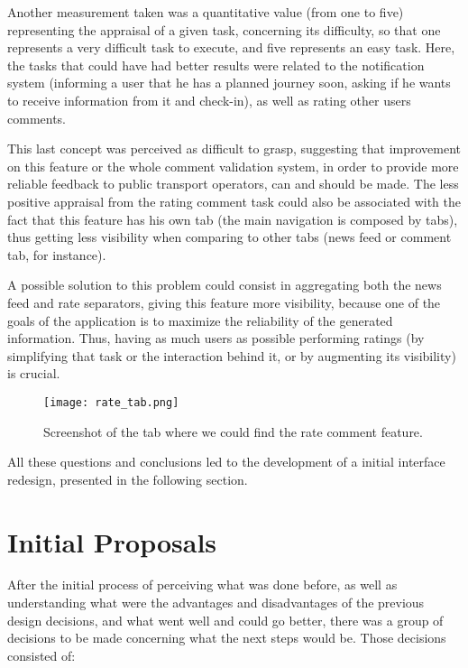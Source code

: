 Another measurement taken was a quantitative value (from one to five) representing the appraisal of a given task, concerning its difficulty, so that one represents a very difficult task to execute, and five represents an easy task.
Here, the tasks that could have had better results were related to the notification system (informing a user that he has a planned journey soon, asking if he wants to receive information from it and check-in), as well as rating other users comments. 

This last concept was perceived as difficult to grasp, suggesting that improvement on this feature or the whole comment validation system, in order to provide more reliable feedback to public transport operators, can and should be made.
The less positive appraisal from the rating comment task could also be associated with the fact that this feature has his own tab (the main navigation is composed by tabs), thus getting less visibility when comparing to other tabs (news feed or comment tab, for instance). 

A possible solution to this problem could consist in aggregating both the news feed and rate separators, giving this feature more visibility, because one of the goals of the application is to maximize the reliability of the generated information. Thus, having as much users as possible performing ratings (by simplifying that task or the interaction behind it, or by augmenting its visibility) is crucial.

\begin{figure}[h!]
  \begin{center}
    \leavevmode
    \texttt{[image: rate\_tab.png]}
    \caption{Screenshot of the tab where we could find the rate comment feature.}
    \label{fig:iso}
  \end{center}
\end{figure}

\pagebreak

All these questions and conclusions led to the development of a initial interface redesign, presented in the following section.

\section{Initial Proposals}\label{sec:initial}

After the initial process of perceiving what was done before, as well as understanding what were the advantages and disadvantages of the previous design decisions, and what went well and could go better, there was a group of decisions to be made concerning what the next steps would be. Those decisions consisted of:

